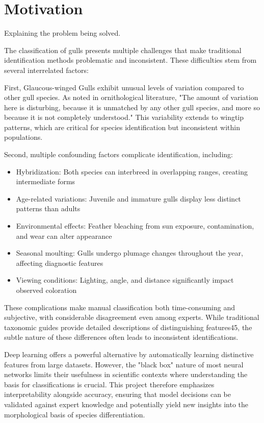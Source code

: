 \section{Motivation}

Explaining the problem being solved.



The classification of gulls presents multiple challenges that make traditional identification methods problematic and inconsistent. These difficulties stem from several interrelated factors:

First, Glaucous-winged Gulls exhibit unusual levels of variation compared to other gull species. As noted in ornithological literature, "The amount of variation here is disturbing, because it is unmatched by any other gull species, and more so because it is not completely understood." This variability extends to wingtip patterns, which are critical for species identification but inconsistent within populations.

Second, multiple confounding factors complicate identification, including:

\begin{itemize}
\item Hybridization: Both species can interbreed in overlapping ranges, creating intermediate forms


\item Age-related variations: Juvenile and immature gulls display less distinct patterns than adults


\item Environmental effects: Feather bleaching from sun exposure, contamination, and wear can alter appearance


\item Seasonal moulting: Gulls undergo plumage changes throughout the year, affecting diagnostic features


\item Viewing conditions: Lighting, angle, and distance significantly impact observed coloration


\end{itemize}
These complications make manual classification both time-consuming and subjective, with considerable disagreement even among experts. While traditional taxonomic guides provide detailed descriptions of distinguishing features45, the subtle nature of these differences often leads to inconsistent identifications.

Deep learning offers a powerful alternative by automatically learning distinctive features from large datasets. However, the "black box" nature of most neural networks limits their usefulness in scientific contexts where understanding the basis for classifications is crucial. This project therefore emphasizes interpretability alongside accuracy, ensuring that model decisions can be validated against expert knowledge and potentially yield new insights into the morphological basis of species differentiation.

